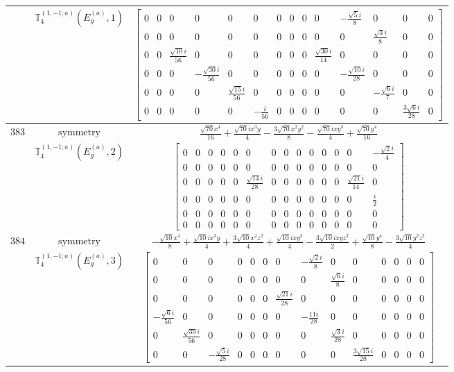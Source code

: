 \documentclass[fleqn,8pt,landscape]{jsarticle}
\begin{document}
\begin{longtable}{ccc}
$  $ & $ \mathbb{T}_{4}^{(1,-1;a)}(E_{g}^{(a)},1) $ & $ \begin{bmatrix} 0 & 0 & 0 & 0 & 0 & 0 & 0 & 0 & 0 & 0 & - \frac{\sqrt{5} i}{8} & 0 & 0 & 0 \\ 0 & 0 & 0 & 0 & 0 & 0 & 0 & 0 & 0 & 0 & 0 & \frac{\sqrt{3} i}{8} & 0 & 0 \\ 0 & 0 & \frac{\sqrt{10} i}{56} & 0 & 0 & 0 & 0 & 0 & 0 & \frac{\sqrt{30} i}{14} & 0 & 0 & 0 & 0 \\ 0 & 0 & 0 & - \frac{\sqrt{30} i}{56} & 0 & 0 & 0 & 0 & 0 & 0 & - \frac{\sqrt{10} i}{28} & 0 & 0 & 0 \\ 0 & 0 & 0 & 0 & \frac{\sqrt{15} i}{56} & 0 & 0 & 0 & 0 & 0 & 0 & - \frac{\sqrt{6} i}{7} & 0 & 0 \\ 0 & 0 & 0 & 0 & 0 & - \frac{i}{56} & 0 & 0 & 0 & 0 & 0 & 0 & \frac{3 \sqrt{6} i}{28} & 0 \end{bmatrix} $ \\ \hline
$ 383 $ & $ \text{symmetry} $ & $ \frac{\sqrt{70} x^{4}}{16} + \frac{\sqrt{70} i x^{3} y}{4} - \frac{3 \sqrt{70} x^{2} y^{2}}{8} - \frac{\sqrt{70} i x y^{3}}{4} + \frac{\sqrt{70} y^{4}}{16} $ \\
$  $ & $ \mathbb{T}_{4}^{(1,-1;a)}(E_{g}^{(a)},2) $ & $ \begin{bmatrix} 0 & 0 & 0 & 0 & 0 & 0 & 0 & 0 & 0 & 0 & 0 & 0 & 0 & - \frac{\sqrt{2} i}{4} \\ 0 & 0 & 0 & 0 & 0 & 0 & 0 & 0 & 0 & 0 & 0 & 0 & 0 & 0 \\ 0 & 0 & 0 & 0 & 0 & \frac{\sqrt{14} i}{28} & 0 & 0 & 0 & 0 & 0 & 0 & \frac{\sqrt{21} i}{14} & 0 \\ 0 & 0 & 0 & 0 & 0 & 0 & 0 & 0 & 0 & 0 & 0 & 0 & 0 & \frac{i}{2} \\ 0 & 0 & 0 & 0 & 0 & 0 & 0 & 0 & 0 & 0 & 0 & 0 & 0 & 0 \\ 0 & 0 & 0 & 0 & 0 & 0 & 0 & 0 & 0 & 0 & 0 & 0 & 0 & 0 \end{bmatrix} $ \\ \hline
$ 384 $ & $ \text{symmetry} $ & $ - \frac{\sqrt{10} x^{4}}{8} + \frac{\sqrt{10} i x^{3} y}{4} + \frac{3 \sqrt{10} x^{2} z^{2}}{4} + \frac{\sqrt{10} i x y^{3}}{4} - \frac{3 \sqrt{10} i x y z^{2}}{2} + \frac{\sqrt{10} y^{4}}{8} - \frac{3 \sqrt{10} y^{2} z^{2}}{4} $ \\
$  $ & $ \mathbb{T}_{4}^{(1,-1;a)}(E_{g}^{(a)},3) $ & $ \begin{bmatrix} 0 & 0 & 0 & 0 & 0 & 0 & 0 & - \frac{\sqrt{2} i}{8} & 0 & 0 & 0 & 0 & 0 & 0 \\ 0 & 0 & 0 & 0 & 0 & 0 & 0 & 0 & \frac{\sqrt{6} i}{8} & 0 & 0 & 0 & 0 & 0 \\ 0 & 0 & 0 & 0 & 0 & 0 & \frac{\sqrt{21} i}{28} & 0 & 0 & 0 & 0 & 0 & 0 & 0 \\ - \frac{\sqrt{6} i}{56} & 0 & 0 & 0 & 0 & 0 & 0 & - \frac{11 i}{28} & 0 & 0 & 0 & 0 & 0 & 0 \\ 0 & \frac{\sqrt{30} i}{56} & 0 & 0 & 0 & 0 & 0 & 0 & \frac{\sqrt{3} i}{28} & 0 & 0 & 0 & 0 & 0 \\ 0 & 0 & - \frac{\sqrt{5} i}{28} & 0 & 0 & 0 & 0 & 0 & 0 & \frac{3 \sqrt{15} i}{28} & 0 & 0 & 0 & 0 \end{bmatrix} $ \\ \hline

\end{longtable}
\end{document}
